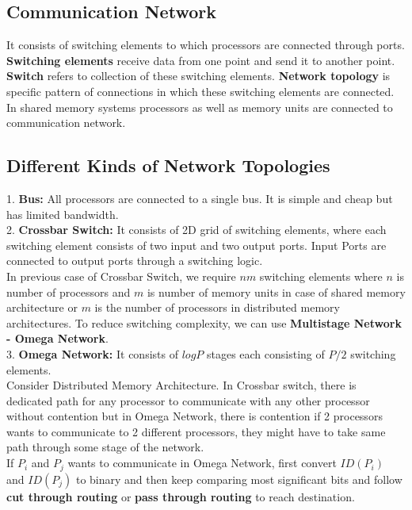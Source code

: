 \documentclass{article}
\begin{document}
\subsection*{Communication Network}
It consists of switching elements to which processors are connected through ports. \textbf{Switching elements} receive data from one point and send it to another point. \textbf{Switch} refers to collection of these switching elements. \textbf{Network topology} is specific pattern of connections in which these switching elements are connected. \\
In shared memory systems processors as well as memory units are connected to communication network. 

\subsection*{Different Kinds of Network Topologies}
1. \textbf{Bus:} All processors are connected to a single bus. It is simple and cheap but has limited bandwidth. \\
2. \textbf{Crossbar Switch:} It consists of 2D grid of switching elements, where each switching element consists of two input and two output ports. Input Ports are connected to output ports through a switching logic. \\

In previous case of Crossbar Switch, we require $nm$ switching elements where $n$ is number of processors and $m$ is number of memory units in case of shared memory architecture or $m$ is the number of processors in distributed memory architectures. To reduce switching complexity, we can use \textbf{Multistage Network - Omega Network}. \\

3. \textbf{Omega Network:} It consists of $log P$ stages each consisting of $P/2$ switching elements. \\

Consider Distributed Memory Architecture. In Crossbar switch, there is dedicated path for any processor to communicate with any other processor without contention but in Omega Network, there is contention if 2 processors wants to communicate to 2 different processors, they might have to take same path through some stage of the network. \\

If $P_i$ and $P_j$ wants to communicate in Omega Network, first convert $ID(P_i)$ and $ID(P_j)$ to binary and then keep comparing most significant bits and follow \textbf{cut through routing} or \textbf{pass through routing} to reach destination. \\
\end{document}
